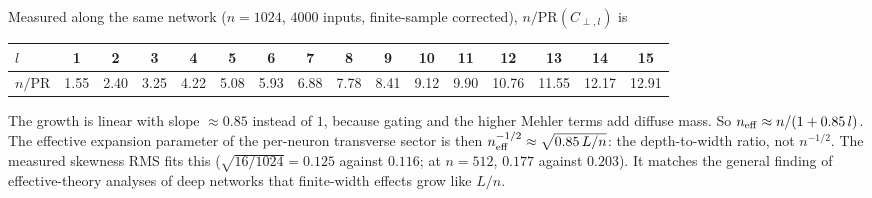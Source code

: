 Measured along the same network ($n=1024$, $4000$ inputs, finite-sample corrected), $n/\mathrm{PR}(C_{\perp,l})$ is
\begin{center}\small
\begin{tabular}{@{}lccccccccccccccc@{}}\toprule
$l$&1&2&3&4&5&6&7&8&9&10&11&12&13&14&15\\\midrule
$n/\mathrm{PR}$&1.55&2.40&3.25&4.22&5.08&5.93&6.88&7.78&8.41&9.12&9.90&10.76&11.55&12.17&12.91\\\bottomrule
\end{tabular}
\end{center}
The growth is linear with slope $\approx0.85$ instead of $1$, because gating and the higher Mehler terms add diffuse
mass. So $n_{\rm eff}\approx n/(1+0.85\,l)$. The effective expansion parameter of the per-neuron transverse sector is then
$n_{\rm eff}^{-1/2}\approx\sqrt{0.85\,L/n}$: the depth-to-width ratio, not $n^{-1/2}$. The measured skewness RMS fits this
($\sqrt{16/1024}=0.125$ against $0.116$; at $n=512$, $0.177$ against $0.203$). It matches the general finding of
effective-theory analyses of deep networks that finite-width effects grow like $L/n$.

